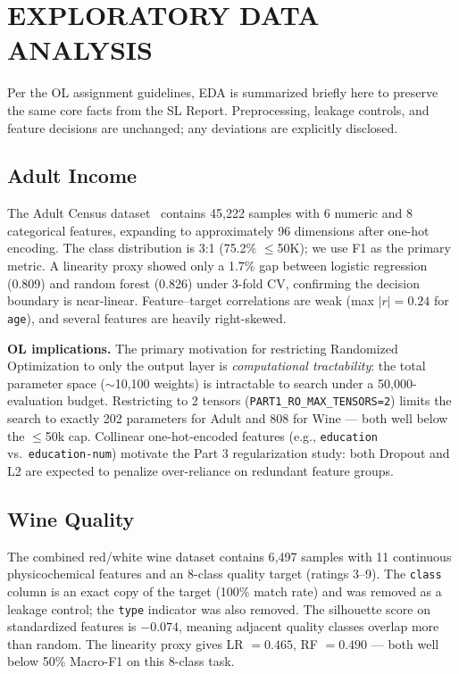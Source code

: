 \documentclass[letterpaper, 10 pt, conference]{ieeeconf}
\begin{document}
\section{EXPLORATORY DATA ANALYSIS}

Per the OL assignment guidelines, EDA is summarized briefly here to preserve the same core facts from the SL Report. Preprocessing, leakage controls, and feature decisions are unchanged; any deviations are explicitly disclosed.

\subsection{Adult Income}

The Adult Census dataset~\cite{kohavi1996} contains 45{,}222 samples with 6 numeric and 8 categorical features, expanding to approximately 96 dimensions after one-hot encoding. The class distribution is 3:1 (75.2\% $\leq$50K); we use F1 as the primary metric. A linearity proxy showed only a 1.7\% gap between logistic regression (0.809) and random forest (0.826) under 3-fold CV, confirming the decision boundary is near-linear. Feature--target correlations are weak (max $|r| = 0.24$ for \texttt{age}), and several features are heavily right-skewed.

\textbf{OL implications.} The primary motivation for restricting Randomized Optimization to only the output layer is \emph{computational tractability}: the total parameter space ($\sim$10{,}100 weights) is intractable to search under a 50{,}000-evaluation budget. Restricting to 2 tensors (\texttt{PART1\_RO\_MAX\_TENSORS=2}) limits the search to exactly 202 parameters for Adult and 808 for Wine --- both well below the $\leq$50k cap. Collinear one-hot-encoded features (e.g., \texttt{education} vs.\ \texttt{education-num}) motivate the Part 3 regularization study: both Dropout and L2 are expected to penalize over-reliance on redundant feature groups.

\subsection{Wine Quality}

The combined red/white wine dataset contains 6{,}497 samples with 11 continuous physicochemical features and an 8-class quality target (ratings 3--9). The \texttt{class} column is an exact copy of the target (100\% match rate) and was removed as a leakage control; the \texttt{type} indicator was also removed. The silhouette score on standardized features is $-0.074$, meaning adjacent quality classes overlap more than random. The linearity proxy gives LR $= 0.465$, RF $= 0.490$ --- both well below 50\% Macro-F1 on this 8-class task.
\end{document}
